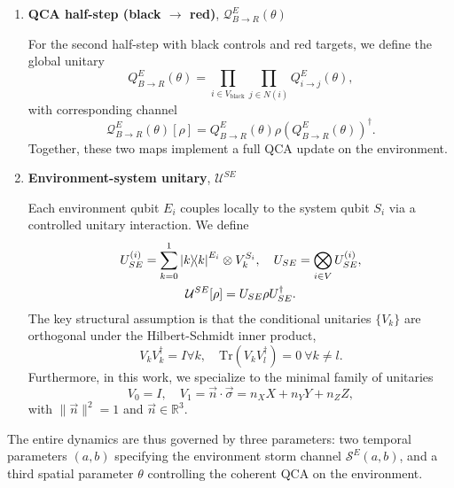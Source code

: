 \documentclass[
    aps,
    prx,
    reprint,
    superscriptaddress,
    longbibliography,
    nofootinbib,
    floatfix,
]{revtex4-2}
\newcommand{\Tr}{\mathrm{Tr}}
\newcommand{\ketbra}[2]{\ket{#1}\!\!\bra{#2}}  %
\begin{document}
\begin{enumerate}
    \item \textbf{QCA half-step (black \(\to\) red)}, \(\mathcal{Q}_{B\to R}^E(\theta)\)
    
    For the second half-step with black controls and red targets, we define the global unitary
    \begin{equation}
        Q^E_{B\to R}(\theta) = \prod_{i\in V_\mathrm{black}} \prod_{j\in N(i)}
        Q^E_{i\to j}(\theta),
    \end{equation}
    with corresponding channel
    \begin{equation}
        \mathcal{Q}_{B\to R}^E(\theta)[\rho] = Q^E_{B\to R}(\theta) \rho (Q^E_{B\to R}(\theta))^\dagger.
    \end{equation}
    Together, these two maps implement a full QCA update on the environment.

    \item \textbf{Environment-system unitary}, \(\mathcal{U}^{SE}\)
    
    Each environment qubit \(E_i\) couples locally to the system qubit \(S_i\) via a controlled unitary interaction. We define
    \begin{equation}\label{eq:qca-se-unitary}
        \begin{gathered}
            U_{SE}^{(i)} = \sum_{k=0}^1 \ketbra{k}{k}^{E_i} \otimes V_k^{S_i}, 
            \quad U_{SE} = \bigotimes_{i \in V} U_{SE}^{(i)},
            \\
            \mathcal{U}^{SE}[\rho] = U_{SE} \rho U_{SE}^\dagger.
        \end{gathered}
    \end{equation}
    The key structural assumption is that the conditional unitaries \(\{V_k\}\) are orthogonal under the Hilbert-Schmidt inner product, 
    \begin{equation}\label{eq:se-unitary-condition}
        V_k V_k^\dagger = I \forall k, \quad \Tr(V_k V_l^\dagger) = 0 \ \forall k \ne l.
    \end{equation}
    Furthermore, in this work, we specialize to the minimal family of unitaries
    \begin{equation}\label{eq:qca-system-unitary}
        V_0 = I, \quad V_1 = \vec{n} \cdot \vec{\sigma} = n_X X + n_Y Y + n_Z Z,
    \end{equation}
    with \(\|\vec{n}\|^2 = 1\) and \(\vec{n} \in \mathbb{R}^3\).
\end{enumerate}
The entire dynamics are thus governed by three parameters: two temporal parameters \((a, b)\) specifying the environment storm channel \(\mathcal{S}^E (a, b)\), and a third spatial parameter \(\theta\) controlling the coherent QCA on the environment.
\end{document}
